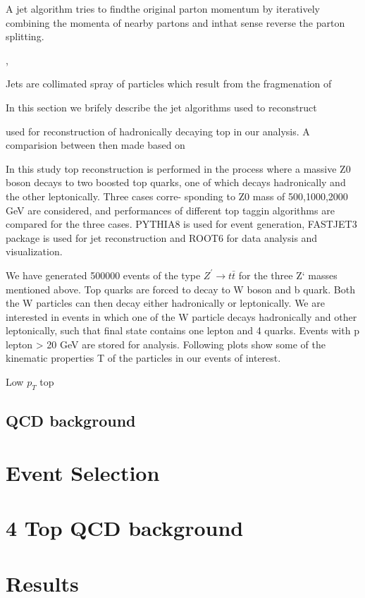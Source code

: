 \documentclass[12pt,a4paper]{article}		%
\begin{document}
	
	  
	 


 A jet algorithm tries to findthe original parton momentum by iteratively combining the momenta of nearby partons and inthat sense reverse the parton splitting.

	,  	

	Jets are collimated spray of particles which result from the fragmenation of  	

	In this section we brifely describe the jet algorithms used to reconstruct 
	 
	used for reconstruction of hadronically decaying top in our analysis. A comparision between then made based on  


In this study top reconstruction is performed in the process where a massive Z0 boson decays to two
boosted top quarks, one of which decays hadronically and the other leptonically. Three cases corre-
sponding to Z0 mass of 500,1000,2000 GeV are considered, and performances of different top taggin
algorithms are compared for the three cases. PYTHIA8 is used for event generation, FASTJET3
package is used for jet reconstruction and ROOT6 for data analysis and visualization.

We have generated 500000 events of the type $Z^\prime \to t \bar{t}$ for the three Z‘ masses mentioned above.
Top quarks are forced to decay to W boson and b quark. Both the W particles can then decay
either hadronically or leptonically. We are interested in events in which one of the W particle decays
hadronically and other leptonically, such that final state contains one lepton and 4 quarks. Events
with p lepton
> 20 GeV are stored for analysis. Following plots show some of the kinematic properties
T
of the particles in our events of interest.


Low $p_T$ top 


\subsection{QCD background}

\newpage

\section{Event Selection}
\newpage
\section{4 Top QCD background}
\newpage
\section{Results}
\newpage
\end{document}
